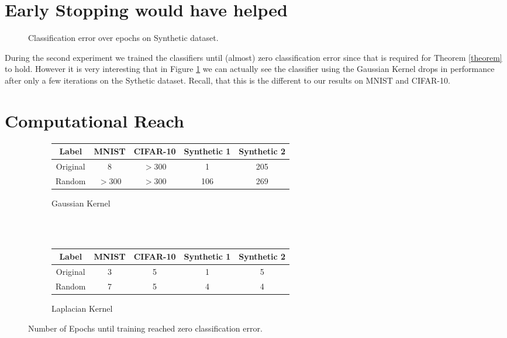 \section{Early Stopping would have helped}

\begin{figure}[!htb]
    \centering
    \caption{Classification error over epochs on Synthetic dataset.}
    \label{fig:stopping}
\end{figure}

During the second experiment we trained the classifiers until (almost) zero classification error since that is required for Theorem \ref{theorem} to hold. However it is very interesting that in Figure \ref{fig:stopping} we can actually see the classifier using the Gaussian Kernel drops in performance after only a few iterations on the Sythetic dataset. Recall, that this is the different to our results on MNIST and CIFAR-10.



\section{Computational Reach}

\begin{figure}[!htb]
\begin{subfigure}{\textwidth}
    \centering
         \begin{tabular}{|c | c | c | c | c |}
         \hline
         Label & MNIST & CIFAR-10 & Synthetic 1 & Synthetic 2\\ [0.5ex]
         \hline
         Original & 8 & $>$300 & 1 & 205 \\
         \hline
         Random & $>$300 & $>$300 & 106 & 269 \\
         \hline
         \end{tabular}
\caption{Gaussian Kernel} \label{fig:ta}
\end{subfigure}
\\
\vspace{0.2cm}
\\
\begin{subfigure}{\textwidth}
    \centering
         \begin{tabular}{|c | c | c | c | c |}
         \hline
         Label & MNIST & CIFAR-10 & Synthetic 1 & Synthetic 2\\ [0.5ex]
         \hline
         Original & 3 & 5 & 1 & 5 \\
         \hline
         Random & 7 & 5 & 4 & 4 \\
         \hline
         \end{tabular}
\caption{Laplacian Kernel} \label{fig:tb}
\end{subfigure}
\caption{Number of Epochs until training reached zero classification error.} \label{fig:table}
\end{figure}

